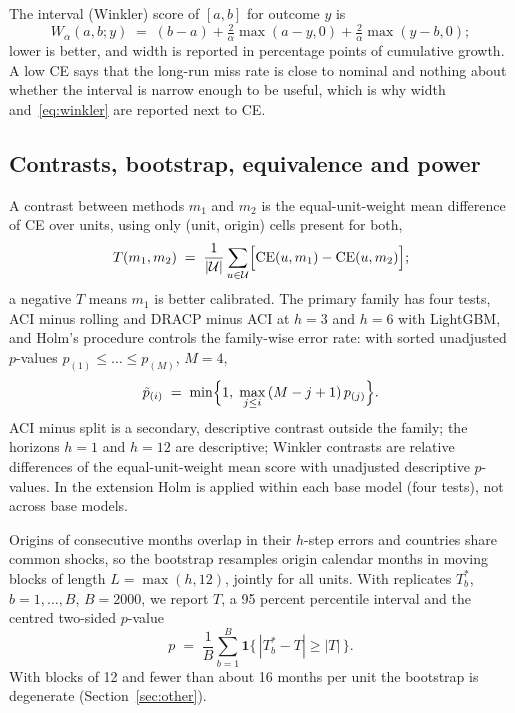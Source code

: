 The interval (Winkler) score \citep{winkler1972,gneiting2007scoring} of $[a,b]$ for outcome $y$ is
\begin{equation}\label{eq:winkler}
W_\alpha(a,b;y) \;=\; (b-a) + \tfrac{2}{\alpha}\max(a-y,0) + \tfrac{2}{\alpha}\max(y-b,0);
\end{equation}
lower is better, and width is reported in percentage points of cumulative growth. A low CE says that the long-run miss rate is close to nominal and nothing about whether the interval is narrow enough to be useful, which is why width and~\eqref{eq:winkler} are reported next to CE.

\subsection{Contrasts, bootstrap, equivalence and power}\label{sec:contrasts}

A contrast between methods $m_1$ and $m_2$ is the equal-unit-weight mean difference of CE over units, using only (unit, origin) cells present for both,
\begin{equation}\label{eq:contrast}
T(m_1,m_2) \;=\; \frac{1}{|\mathcal U|}\sum_{u\in\mathcal U}\Bigl[\mathrm{CE}(u,m_1)-\mathrm{CE}(u,m_2)\Bigr];
\end{equation}
a negative $T$ means $m_1$ is better calibrated. The primary family has four tests, ACI minus rolling and DRACP minus ACI at $h=3$ and $h=6$ with LightGBM, and Holm's procedure \citep{holm1979} controls the family-wise error rate: with sorted unadjusted $p$-values $p_{(1)}\le\dots\le p_{(M)}$, $M=4$,
\begin{equation}\label{eq:holm}
\tilde p_{(i)} \;=\; \min\Bigl\{1,\;\max_{j\le i}\,(M-j+1)\,p_{(j)}\Bigr\}.
\end{equation}
ACI minus split is a secondary, descriptive contrast outside the family; the horizons $h=1$ and $h=12$ are descriptive; Winkler contrasts are relative differences of the equal-unit-weight mean score with unadjusted descriptive $p$-values. In the extension Holm is applied within each base model (four tests), not across base models.

Origins of consecutive months overlap in their $h$-step errors and countries share common shocks, so the bootstrap resamples origin calendar months in moving blocks \citep{kunsch1989} of length $L=\max(h,12)$, jointly for all units. With replicates $T^{*}_b$, $b=1,\dots,B$, $B=2000$, we report $T$, a 95 percent percentile interval and the centred two-sided $p$-value
\begin{equation}\label{eq:pboot}
p \;=\; \frac{1}{B}\sum_{b=1}^{B}\mathbf 1\bigl\{\,|T^{*}_b-T|\ge |T|\,\bigr\}.
\end{equation}
With blocks of 12 and fewer than about 16 months per unit the bootstrap is degenerate (Section~\ref{sec:other}).

